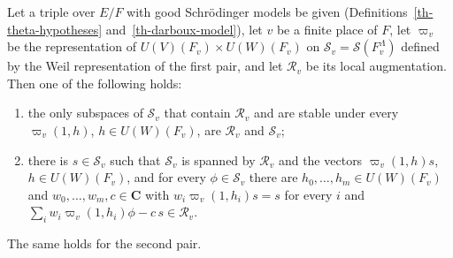 \begin{theorem}\label{th-howe-finite}
Let a triple over $E/F$ with good Schrödinger models be given
(Definitions~\ref{th-theta-hypotheses} and~\ref{th-darboux-model}), let $v$
be a finite place of $F$, let $\varpi_v$ be the representation of
$U(V)(F_v)\times U(W)(F_v)$ on $\mathcal S_v=\mathcal S(F_v^\Lambda)$ defined
by the Weil representation of the first pair, and let $\mathcal R_v$ be its
local augmentation. Then one of the following holds:
\begin{enumerate}
\item the only subspaces of $\mathcal S_v$ that contain $\mathcal R_v$ and are
  stable under every $\varpi_v(1,h)$, $h\in U(W)(F_v)$, are $\mathcal R_v$ and
  $\mathcal S_v$;
\item there is $s\in\mathcal S_v$ such that $\mathcal S_v$ is spanned by
  $\mathcal R_v$ and the vectors $\varpi_v(1,h)s$, $h\in U(W)(F_v)$, and for
  every $\phi\in\mathcal S_v$ there are $h_0,\ldots,h_m\in U(W)(F_v)$ and
  $w_0,\ldots,w_m,c\in\mathbf C$ with $w_i\varpi_v(1,h_i)s=s$ for every $i$ and
  $\sum_iw_i\varpi_v(1,h_i)\phi-c\,s\in\mathcal R_v$.
\end{enumerate}
The same holds for the second pair.
\end{theorem}

